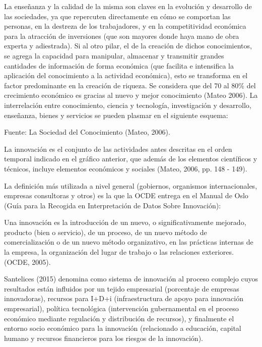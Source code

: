 \documentclass{article}
\begin{document}
La enseñanza y la calidad de la misma son claves en la evolución y desarrollo de las sociedades, ya que repercuten directamente en cómo se comportan las personas, en la destreza de los trabajadores, y en la competitividad económica para la atracción de inversiones (que son mayores donde haya mano de obra experta y adiestrada). Si al otro pilar, el de la creación de dichos conocimientos, se agrega la capacidad para manipular, almacenar y transmitir grandes cantidades de información de forma económica (que facilita e intensifica la aplicación del conocimiento a la actividad económica), esto se transforma en el factor predominante en la creación de riqueza. Se considera que del 70 al 80\% del crecimiento económico es gracias al nuevo y mejor conocimiento (Mateo 2006). La interrelación entre conocimiento, ciencia y tecnología, investigación y desarrollo, enseñanza, bienes y servicios se pueden plasmar en el siguiente esquema:


Fuente: La Sociedad del Conocimiento (Mateo, 2006).

La innovación es el conjunto de las actividades antes descritas en el orden temporal indicado en el gráfico anterior, que además de los elementos científicos y técnicos, incluye elementos económicos y sociales (Mateo, 2006, pp. 148 - 149).

La definición más utilizada a nivel general (gobiernos, organismos internacionales, empresas consultoras y otros) es la que la OCDE entrega en el Manual de Oslo (Guía para la Recogida en Interpretación de Datos Sobre Innovación):

Una innovación es la introducción de un nuevo, o significativamente mejorado, producto (bien o servicio), de un proceso, de un nuevo método de comercialización o de un nuevo método organizativo, en las prácticas internas de la empresa, la organización del lugar de trabajo o las relaciones exteriores. (OCDE, 2005).

Santelices (2015) denomina como sistema de innovación al proceso complejo cuyos resultados están influidos por un tejido empresarial (porcentaje de empresas innovadoras), recursos para I+D+i (infraestructura de apoyo para innovación empresarial), política tecnológica (intervención gubernamental en el proceso económico mediante regulación y distribución de recursos), y finalmente el entorno socio económico para la innovación (relacionado a educación, capital humano y recursos financieros para los riesgos de la innovación).
\end{document}
